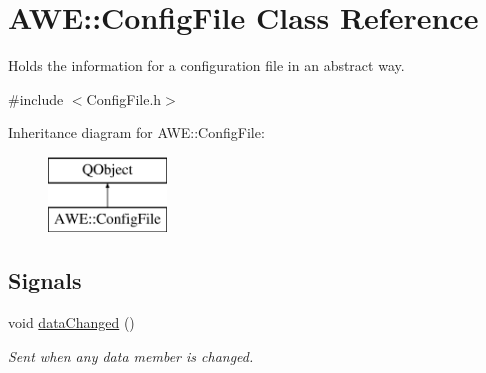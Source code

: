 \hypertarget{class_a_w_e_1_1_config_file}{\section{A\-W\-E\-:\-:Config\-File Class Reference}
\label{class_a_w_e_1_1_config_file}
}


Holds the information for a configuration file in an abstract way.  




{\ttfamily \#include $<$Config\-File.\-h$>$}

Inheritance diagram for A\-W\-E\-:\-:Config\-File\-:\begin{figure}[H]
\begin{center}
\leavevmode
\includegraphics[height=2.000000cm]{class_a_w_e_1_1_config_file}
\end{center}
\end{figure}
\subsection*{Signals}
\begin{DoxyCompactItemize}
\item 
\hypertarget{class_a_w_e_1_1_config_file_adac2c26c4b9381a6c0f73d8df4494cdd}{void \hyperlink{class_a_w_e_1_1_config_file_adac2c26c4b9381a6c0f73d8df4494cdd}{data\-Changed} ()}\label{class_a_w_e_1_1_config_file_adac2c26c4b9381a6c0f73d8df4494cdd}

\begin{DoxyCompactList}\small\item\em Sent when any data member is changed. \end{DoxyCompactList}\end{DoxyCompactItemize}
